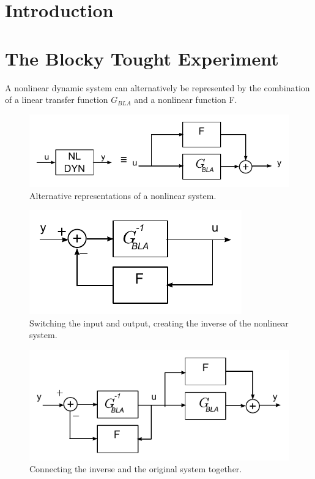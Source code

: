 %
%
\section{Introduction}
\section{The Blocky Tought Experiment}

		A nonlinear dynamic system can alternatively be represented by the combination of a linear transfer function $G_{BLA}$ and a nonlinear function F.
		\begin{figure}[hbtp]
			\centering
			\includegraphics{images/lego1}
			\caption{Alternative representations of a nonlinear system. }
		\end{figure}
	
		\begin{figure}[hbtp]
			\centering
			\includegraphics{images/lego2}
			\caption{Switching the input and output, creating the inverse of the nonlinear system. }
		\end{figure}

		\begin{figure}[hbtp]
			\centering
			\includegraphics{images/lego3}
			\caption{Connecting the inverse and the original system together. }
		\end{figure}

